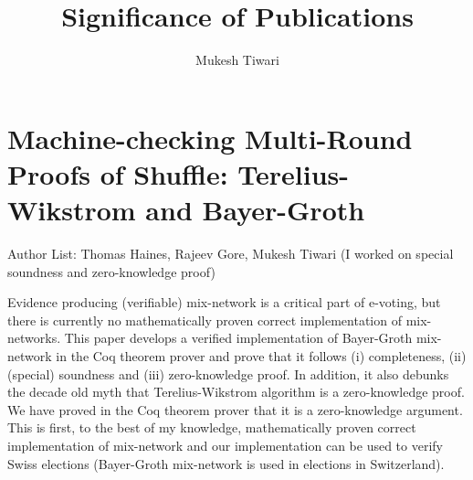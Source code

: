 \documentclass[a4paper]{article}
\title{Significance of Publications}
\author{Mukesh Tiwari}
\date{}
\begin{document}
\fontsize{12}{15}
\selectfont
\maketitle



\section{Machine-checking Multi-Round Proofs of Shuffle: Terelius-Wikstrom and Bayer-Groth}
Author List: Thomas Haines, Rajeev Gore, Mukesh Tiwari (I worked on special soundness and zero-knowledge proof)

Evidence producing (verifiable) mix-network is a critical part of e-voting, but
there is currently no mathematically proven correct implementation of mix-networks.
This paper develops a verified implementation of Bayer-Groth mix-network in the Coq theorem prover 
and prove that it follows (i) completeness, (ii) (special) soundness and (iii) zero-knowledge proof. 
In addition, it also debunks the decade old myth that Terelius-Wikstrom algorithm 
is a zero-knowledge proof. We have proved in the Coq theorem prover that it is a 
zero-knowledge argument. This is first, to the best of my knowledge, mathematically proven 
correct implementation of mix-network and 
our implementation can be used to verify Swiss elections 
(Bayer-Groth mix-network is used in elections in Switzerland).
\end{document}
